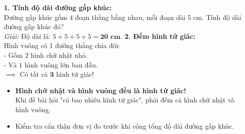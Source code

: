 \documentclass[11pt,a4paper]{article}
\begin{document}
\vspace{-1.5mm}
\noindent
\begin{minipage}[t]{0.49\textwidth}\vspace{0pt}
\begin{tcolorbox}[
  enhanced,
  colback=green!4!white,
  colframe=green!60!black,
  arc=2mm, boxrule=0.8pt,
  left=2mm, right=2mm, top=1.8mm, bottom=1.8mm,
  title={\footnotesize\bfseries\color{white}\faCheckCircle\ 4. Ví dụ thực hành chuẩn mực}
]
{\footnotesize
\textbf{1. Tính độ dài đường gấp khúc:}\\
Đường gấp khúc gồm $4$ đoạn thẳng bằng nhau, mỗi đoạn dài $5\text{ cm}$. Tính độ dài đường gấp khúc đó?\\
\textit{Giải:} Độ dài là: $5 + 5 + 5 + 5 = \mathbf{20\text{ cm}}$.
\textbf{2. Đếm hình tứ giác:}\\
Hình vuông có 1 đường thẳng chia đôi:\\
- Gồm $2$ hình chữ nhật nhỏ.\\
- Và $1$ hình vuông lớn ban đầu.\\
$\implies$ Có tất cả $\mathbf{3}$ hình tứ giác!
}
\end{tcolorbox}
\end{minipage}
\hfill
\begin{minipage}[t]{0.49\textwidth}\vspace{0pt}
\begin{tcolorbox}[
  enhanced,
  colback=red!4!white,
  colframe=red!75!black,
  arc=2mm, boxrule=0.8pt,
  left=2mm, right=2mm, top=1.8mm, bottom=1.8mm,
  title={\footnotesize\bfseries\color{white}\faExclamationTriangle\ 5. Mẹo tránh bẫy trắc nghiệm}
]
{\footnotesize
\begin{itemize}\setlength{\itemsep}{1pt}\setlength{\leftskip}{-2.5mm}
  \item \textbf{Hình chữ nhật và hình vuông đều là hình tứ giác!}\\
  Khi đề bài hỏi "có bao nhiêu hình tứ giác", phải đếm cả hình chữ nhật và hình vuông.
  \item Kiểm tra cẩn thận đơn vị đo trước khi cộng tổng độ dài đường gấp khúc.
\end{itemize}
}
\end{tcolorbox}
\end{minipage}
\end{document}

